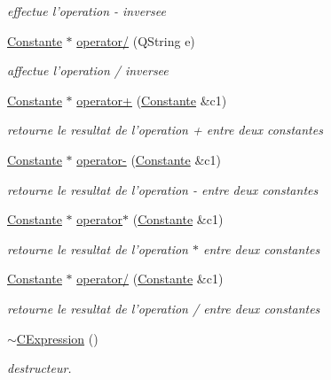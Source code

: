 \begin{DoxyCompactItemize}
\begin{DoxyCompactList}\small\item\em effectue l'operation -\/ inversee \end{DoxyCompactList}\item 
\hyperlink{class_constante}{Constante} $\ast$ \hyperlink{class_c_expression_af5816c2cd38da72d65631f1b8f7c67e8}{operator/} (Q\-String e)
\begin{DoxyCompactList}\small\item\em affectue l'operation / inversee \end{DoxyCompactList}\item 
\hyperlink{class_constante}{Constante} $\ast$ \hyperlink{class_c_expression_a673be1d66195b8ee7fac79b53d8cf371}{operator+} (\hyperlink{class_constante}{Constante} \&c1)
\begin{DoxyCompactList}\small\item\em retourne le resultat de l'operation + entre deux constantes \end{DoxyCompactList}\item 
\hyperlink{class_constante}{Constante} $\ast$ \hyperlink{class_c_expression_af7fdc3e9fa28257c0cdfed04995cbe8e}{operator-\/} (\hyperlink{class_constante}{Constante} \&c1)
\begin{DoxyCompactList}\small\item\em retourne le resultat de l'operation -\/ entre deux constantes \end{DoxyCompactList}\item 
\hyperlink{class_constante}{Constante} $\ast$ \hyperlink{class_c_expression_a0bcd0e43fe294b187d7ff7240a246ac2}{operator$\ast$} (\hyperlink{class_constante}{Constante} \&c1)
\begin{DoxyCompactList}\small\item\em retourne le resultat de l'operation $\ast$ entre deux constantes \end{DoxyCompactList}\item 
\hyperlink{class_constante}{Constante} $\ast$ \hyperlink{class_c_expression_a92584ee17ad2f42488a37aa991fa3352}{operator/} (\hyperlink{class_constante}{Constante} \&c1)
\begin{DoxyCompactList}\small\item\em retourne le resultat de l'operation / entre deux constantes \end{DoxyCompactList}\item 
\hypertarget{class_c_expression_a622d1164b24e06c6393ea8c2eb387fb0}{\hyperlink{class_c_expression_a622d1164b24e06c6393ea8c2eb387fb0}{$\sim$\-C\-Expression} ()}\label{class_c_expression_a622d1164b24e06c6393ea8c2eb387fb0}

\begin{DoxyCompactList}\small\item\em destructeur. \end{DoxyCompactList}\end{DoxyCompactItemize}


